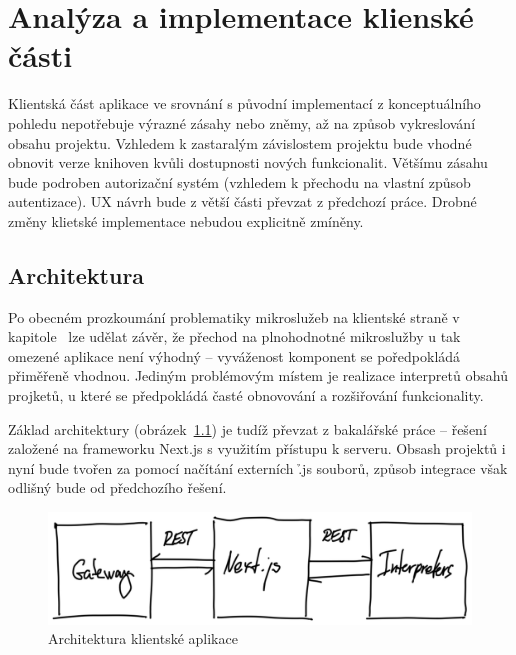 \chapter{Analýza a implementace klienské části}\label{ch:client}


Klientská část aplikace ve srovnání s původní implementací z konceptuálního pohledu nepotřebuje výrazné zásahy nebo zněmy, až na způsob vykreslování obsahu projektu.
Vzhledem k zastaralým závislostem projektu bude vhodné obnovit verze knihoven kvůli dostupnosti nových funkcionalit.
Většímu zásahu bude podroben autorizační systém (vzhledem k přechodu na vlastní způsob autentizace).
UX návrh bude z větší části převzat z předchozí práce.
Drobné změny klietské implementace nebudou explicitně zmíněny.



\section{Architektura}\label{sec:client-arch}
Po obecném prozkoumání problematiky mikroslužeb na klientské straně v kapitole~ lze udělat závěr, že přechod na plnohodnotné mikroslužby u tak omezené aplikace není výhodný – vyváženost komponent se poředpokládá přiměřeně vhodnou.
Jediným problémovým místem je realizace interpretů obsahů projketů, u které se předpokládá časté obnovování a rozšiřování funkcionality.

Základ architektury (obrázek~\ref{fig:client-arch}) je tudíž převzat z bakalářské práce – řešení založené na frameworku Next.js s využitím  přístupu k serveru.
Obsash projektů i nyní bude tvořen za pomocí načítání externích \h{.js} souborů, způsob integrace však odlišný bude od předchozího řešení.


\begin{figure}[htbp]
   \centering
   \includegraphics[max width=\textwidth]{assets/draft-fe-arch}
   \caption{Architektura klientské aplikace}\label{fig:client-arch}
\end{figure}



